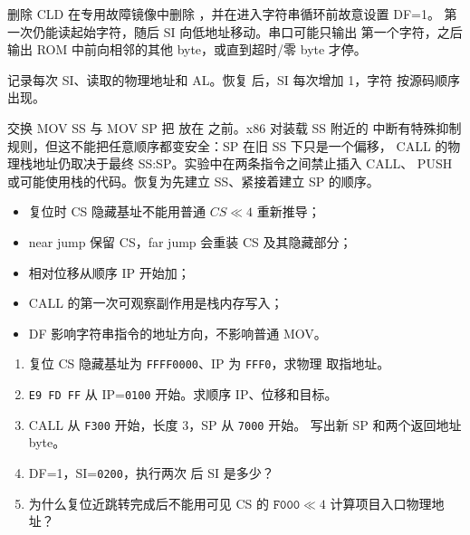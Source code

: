 \begin{faultinjectionbox}{删除 CLD}
在专用故障镜像中删除 ，并在进入字符串循环前故意设置 DF=1。
 第一次仍能读起始字符，随后 SI 向低地址移动。串口可能只输出
第一个字符，之后输出 ROM 中前向相邻的其他 byte，或直到超时/零 byte 才停。

记录每次 SI、读取的物理地址和 AL。恢复  后，SI 每次增加 1，字符
按源码顺序出现。
\end{faultinjectionbox}

\begin{faultinjectionbox}{交换 MOV SS 与 MOV SP}
把  放在  之前。x86 对装载 SS 附近的
中断有特殊抑制规则，但这不能把任意顺序都变安全：SP 在旧 SS 下只是一个偏移，
CALL 的物理栈地址仍取决于最终 SS:SP。实验中在两条指令之间禁止插入 CALL、
PUSH 或可能使用栈的代码。恢复为先建立 SS、紧接着建立 SP 的顺序。
\end{faultinjectionbox}

\begin{pitfallbox}
\begin{itemize}[leftmargin=2.2em]
  \item 复位时 CS 隐藏基址不能用普通 \(CS\ll4\) 重新推导；
  \item near jump 保留 CS，far jump 会重装 CS 及其隐藏部分；
  \item 相对位移从顺序 IP 开始加；
  \item CALL 的第一次可观察副作用是栈内存写入；
  \item DF 影响字符串指令的地址方向，不影响普通 MOV。
\end{itemize}
\end{pitfallbox}


\begin{enumerate}[leftmargin=2.2em]
  \item 复位 CS 隐藏基址为 \texttt{FFFF0000}、IP 为 \texttt{FFF0}，求物理
    取指地址。
  \item \texttt{E9 FD FF} 从 IP=\texttt{0100} 开始。求顺序 IP、位移和目标。
  \item CALL 从 \texttt{F300} 开始，长度 3，SP 从 \texttt{7000} 开始。
    写出新 SP 和两个返回地址 byte。
  \item DF=1，SI=\texttt{0200}，执行两次  后 SI 是多少？
  \item 为什么复位近跳转完成后不能用可见 CS 的
    \(\texttt{F000}\ll4\) 计算项目入口物理地址？
\end{enumerate}

